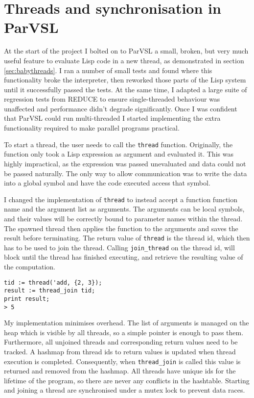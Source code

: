 \section{Threads and synchronisation in ParVSL}
\label{sec:threads}

At the start of the project I bolted on to ParVSL a small, broken, but very much useful feature to evaluate
Lisp code in a new thread, as demonstrated in section \ref{sec:babythreads}. I ran a number of small tests
and found where this functionality broke the interpreter, then reworked those parts of the Lisp system
until it successfully passed the tests. At the same time, I adapted a large suite of regression tests
from REDUCE to ensure single-threaded behaviour was unaffected and performance didn't degrade significantly.
Once I was confident that ParVSL could run multi-threaded I started implementing the extra functionality
required to make parallel programs practical.

To start a thread, the user needs to call the \verb|thread| function.
Originally, the function only took a Lisp expression as argument and evaluated it. This was highly impractical,
as the expression was passed unevaluated and data could not be passed naturally. The only way to allow
communication was to write the data into a global symbol and have the code executed access that symbol.

I changed the implementation of \verb|thread| to instead accept a function function name and the argument list
as arguments. The arguments can be local symbols, and their values will be correctly bound to parameter names
within the thread. The spawned thread then applies the function to the arguments and saves the result
before terminating. The return value of \verb|thread| is the thread id, which then has to be used to
join the thread. Calling  \verb|join_thread| on the thread id, will block until the thread has finished
executing, and retrieve the resulting value of the computation.

\begin{verbatim}
tid := thread('add, {2, 3});
result := thread_join tid;
print result;
> 5
\end{verbatim}

My implementation minimises overhead. The list of arguments is managed on the heap which is visible by all
threads, so a simple pointer is enough to pass them. Furthermore, all unjoined threads and corresponding return values
need to be tracked.
A hashmap from thread ids to return values is updated when thread execution is completed.
Consequently, when \verb|thread_join| is called this value is returned and removed from the hashmap. All threads
have unique ids for the lifetime of the program, so there are never any conflicts in the hashtable.
Starting and joining a thread are synchronised under a mutex lock to prevent data races.

